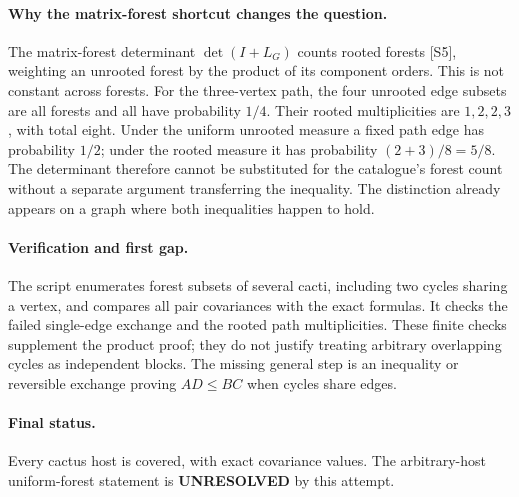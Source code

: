 \documentclass[11pt,a4paper]{article}
\begin{document}
\paragraph{Why the matrix-forest shortcut changes the question.}
The matrix-forest determinant $\det(I+L_G)$ counts rooted forests [S5], weighting an unrooted forest by the product of its component orders. This is not constant across forests. For the three-vertex path, the four unrooted edge subsets are all forests and all have probability $1/4$. Their rooted multiplicities are $1,2,2,3$, with total eight. Under the uniform unrooted measure a fixed path edge has probability $1/2$; under the rooted measure it has probability $(2+3)/8=5/8$. The determinant therefore cannot be substituted for the catalogue's forest count without a separate argument transferring the inequality. The distinction already appears on a graph where both inequalities happen to hold.

\paragraph{Verification and first gap.}
The script enumerates forest subsets of several cacti, including two cycles sharing a vertex, and compares all pair covariances with the exact formulas. It checks the failed single-edge exchange and the rooted path multiplicities. These finite checks supplement the product proof; they do not justify treating arbitrary overlapping cycles as independent blocks. The missing general step is an inequality or reversible exchange proving $AD\le BC$ when cycles share edges.

\paragraph{Final status.}
Every cactus host is covered, with exact covariance values. The arbitrary-host uniform-forest statement is \textbf{UNRESOLVED} by this attempt.
\end{document}
